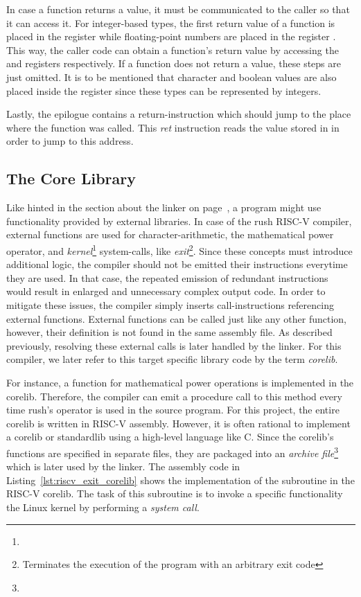In case a function returns a value, it must be communicated to the caller so that it can access it.
For integer-based types, the first return value of a function is placed in the register 
while floating-point numbers are placed in the register .
This way, the caller code can obtain a function's return value by accessing the  and 
registers respectively. If a function does not return a value, these steps are just omitted.
It is to be mentioned that character and boolean values are also placed inside the  register since these types can be represented by integers.

Lastly, the epilogue contains a return-instruction which should jump to the place where the function was called.
This \emph{ret} instruction reads the value stored in  in order to jump to this address.

\subsection{The Core Library}

Like hinted in the section about the linker on page~\pageref{sec:linker},
a program might use functionality provided by external libraries.
In case of the rush RISC-V compiler, external functions are used for character-arithmetic,
the mathematical power operator, and \emph{kernel}\footnote{} system-calls,
like \emph{exit}\footnote{Terminates the execution of the program with an arbitrary exit code}.
Since these concepts must introduce additional logic, the compiler should not be emitted their instructions everytime they are used.
In that case, the repeated emission of redundant instructions would result in enlarged and unnecessary complex output code.
In order to mitigate these issues, the compiler simply inserts call-instructions referencing external functions.
External functions can be called just like any other function, however, their definition is not found in the same assembly file.
As described previously, resolving these external calls is later handled by the linker.
For this compiler, we later refer to this target specific library code by the term \emph{corelib}.

For instance, a function for mathematical power operations is implemented in the corelib.
Therefore, the compiler can emit a procedure call to this method every time rush's \qVerb{**} operator is used in the source program.
For this project, the entire corelib is written in RISC-V assembly.
However, it is often rational to implement a corelib or standardlib using a high-level language like C.
Since the corelib's functions are specified in separate files, they are packaged into an \emph{archive file}\footnote{} which is later used by the linker.
The assembly code in Listing~\ref{lst:riscv_exit_corelib} shows the implementation of the  subroutine in the RISC-V corelib.
The task of this subroutine is to invoke a specific functionality the Linux kernel by performing a \emph{system call}.

